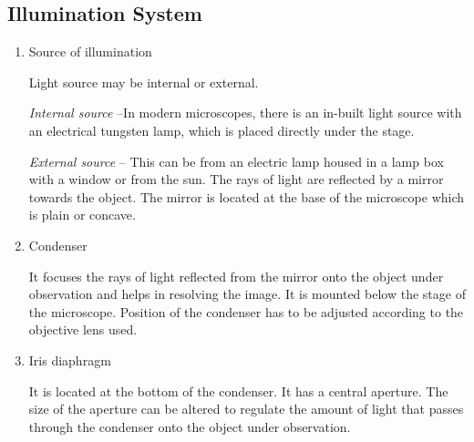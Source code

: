 \documentclass[a4paper,12pt,openany,oneside]{book}
\begin{document}
		\subsection*{Illumination System}
		\begin{enumerate}

			\item{Source of illumination \newline
				\par Light source may be internal or external.
				\par \textit{Internal source} –In modern microscopes, there is an in-built light source with an electrical tungsten lamp, which is placed directly under the stage.
				\par \textit{External source} – This can be from an electric lamp housed in a lamp box with a window or from the sun. The rays of light are reflected by a mirror towards the object. The mirror is located at the base of the microscope which is plain or concave.}
			\item{Condenser
				\par It focuses the rays of light reflected from the mirror onto the object under observation and helps in resolving the image. It is mounted below the stage of the microscope. Position of the condenser has to be adjusted according to the objective lens used.}
			\item{Iris diaphragm
				\par It is located at the bottom of the condenser. It has a central aperture. The size of the aperture can be altered to regulate the amount of light that passes through the condenser onto the object under observation.}
		\end{enumerate}
\end{document}
